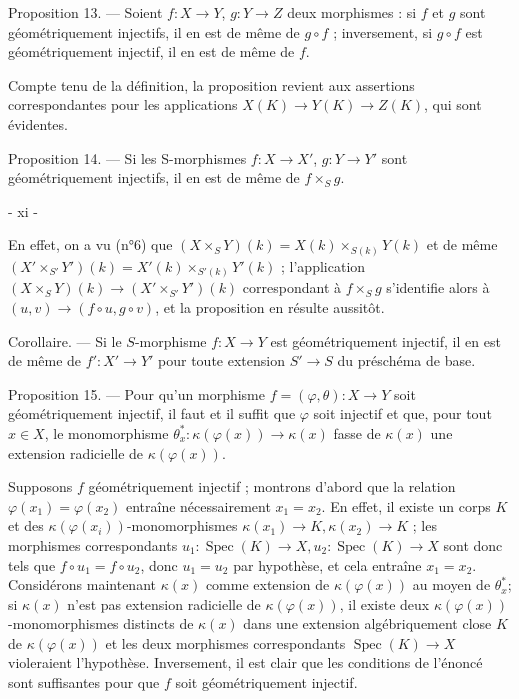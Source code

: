 Proposition 13. — Soient $f : X \to Y$, $g : Y \to Z$ deux morphismes : si $f$ et $g$ sont géométriquement injectifs, il en est de même de $g \circ f$ ; inversement, si $g \circ f$ est géométriquement injectif, il en est de même de $f$.

Compte tenu de la définition, la proposition revient aux assertions correspondantes pour les applications $X(K) \to Y(K) \to Z(K)$, qui sont évidentes.

Proposition 14. — Si les S-morphismes $f : X \to X'$, $g : Y \to Y'$ sont géométriquement injectifs, il en est de même de $f \times_S g$.

\newpage


- xi -

En effet, on a vu (n°6) que $(X \times_S Y)(k) = X(k) \times_{S(k)} Y(k)$ et de même $(X' \times_{S'} Y')(k) = X'(k) \times_{S'(k)} Y'(k)$ ; l'application $(X \times_S Y)(k) \to (X' \times_{S'} Y')(k)$ correspondant à $f \times_S g$ s'identifie alors à $(u,v) \to (f \circ u, g \circ v)$, et la proposition en résulte aussitôt.

Corollaire. — Si le $S$-morphisme $f: X \to Y$ est géométriquement injectif, il en est de même de $f' : X' \to Y'$ pour toute extension $S' \to S$ du préschéma de base.

Proposition 15. — Pour qu'un morphisme $f = (\varphi, \theta) : X \to Y$ soit géométriquement injectif, il faut et il suffit que $\varphi$ soit injectif et que, pour tout $x \in X$, le monomorphisme $\theta_x^* : \kappa(\varphi(x)) \to \kappa(x)$ fasse de $\kappa(x)$ une extension radicielle de $\kappa(\varphi(x))$.

Supposons $f$ géométriquement injectif ; montrons d'abord que la relation $\varphi(x_1) = \varphi(x_2)$ entraîne nécessairement $x_1 = x_2$. En effet, il existe un corps $K$ et des $\kappa(\varphi(x_i))$-monomorphismes $\kappa(x_1) \to K, \kappa(x_2) \to K$ ; les morphismes correspondants $u_1 : \operatorname{Spec}(K) \to X, u_2 : \operatorname{Spec}(K) \to X$ sont donc tels que $f \circ u_1 = f \circ u_2$, donc $u_1 = u_2$ par hypothèse, et cela entraîne $x_1 = x_2$. Considérons maintenant $\kappa(x)$ comme extension de $\kappa(\varphi(x))$ au moyen de $\theta_x^*$; si $\kappa(x)$ n'est pas extension radicielle de $\kappa(\varphi(x))$, il existe deux $\kappa(\varphi(x))$-monomorphismes distincts de $\kappa(x)$ dans une extension algébriquement close $K$ de $\kappa(\varphi(x))$ et les deux morphismes correspondants $\operatorname{Spec}(K) \to X$ violeraient l'hypothèse. Inversement, il est clair que les conditions de l'énoncé sont suffisantes pour que $f$ soit géométriquement injectif.

